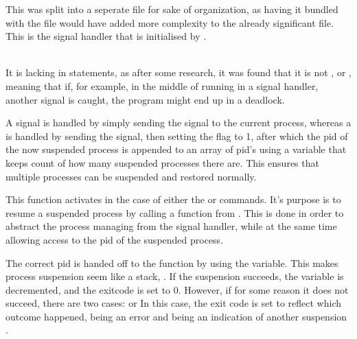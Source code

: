 \documentclass[12pt, a4paper]{report}
\begin{document}
                This was split into a seperate file for sake of organization, as having it
                bundled with the  file would have added more complexity
                to the already significant file.\\[-30pt]

                This is the signal handler that is initialised by .
                
                \begingroup
                    \fontsize{10pt}{10pt}\selectfont
                \endgroup\\[-30pt]
                It is lacking in  statements, as after some research,
                it was found that it is not , or ,
                meaning that if, for example, in the middle of running 
                in a signal handler, another signal is caught, the program might 
                end up in a deadlock.

                A  signal is handled by simply sending the signal to the
                current process, whereas a  is handled by sending the
                signal, then setting the  flag to 1, after which the
                pid of the now suspended process is appended to an array of pid's
                using a variable that keeps count of how many suspended processes there are.
                This ensures that multiple processes can be suspended and restored normally.

                \clearpage
                This function activates in the case of either the  or
                 commands. It's purpose is to resume a suspended process
                by calling a function from . This is done 
                in order to abstract the process managing  from the signal handler, while at the same time allowing
                access to the pid of the suspended process.

                The correct pid is handed off to the function by using the 
                 variable. This makes process suspension seem
                like a stack, . If the suspension
                succeeds, the  variable is decremented, and the
                exitcode is set to 0. However, if for some reason it does not succeed,
                there are two cases:  or  In this case, the exit code is set to reflect which
                outcome happened,  being an error and  being an indication
                of another suspension .
            
\end{document}
